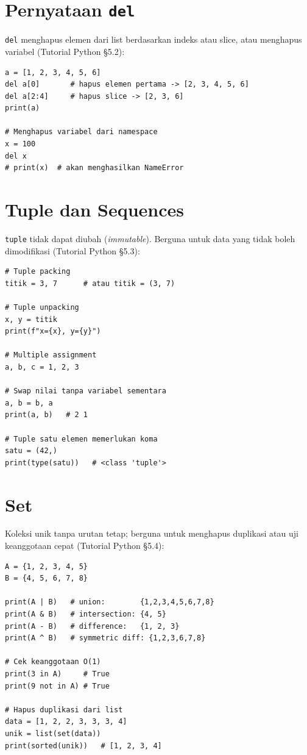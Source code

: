 \documentclass[../main.tex]{subfiles}
\begin{document}
\section{Pernyataan \texttt{del}}

\texttt{del} menghapus elemen dari list berdasarkan indeks atau slice, atau menghapus variabel (Tutorial Python §5.2):

\begin{lstlisting}[caption=Pernyataan del]
a = [1, 2, 3, 4, 5, 6]
del a[0]       # hapus elemen pertama -> [2, 3, 4, 5, 6]
del a[2:4]     # hapus slice -> [2, 3, 6]
print(a)

# Menghapus variabel dari namespace
x = 100
del x
# print(x)  # akan menghasilkan NameError
\end{lstlisting}

\section{Tuple dan Sequences}

\texttt{tuple} tidak dapat diubah (\textit{immutable}). Berguna untuk data yang tidak boleh dimodifikasi (Tutorial Python §5.3):

\begin{lstlisting}[caption=Tuple: packing dan unpacking]
# Tuple packing
titik = 3, 7      # atau titik = (3, 7)

# Tuple unpacking
x, y = titik
print(f"x={x}, y={y}")

# Multiple assignment
a, b, c = 1, 2, 3

# Swap nilai tanpa variabel sementara
a, b = b, a
print(a, b)   # 2 1

# Tuple satu elemen memerlukan koma
satu = (42,)
print(type(satu))   # <class 'tuple'>
\end{lstlisting}

\section{Set}

Koleksi unik tanpa urutan tetap; berguna untuk menghapus duplikasi atau uji keanggotaan cepat (Tutorial Python §5.4):

\begin{lstlisting}[caption=Operasi set]
A = {1, 2, 3, 4, 5}
B = {4, 5, 6, 7, 8}

print(A | B)   # union:        {1,2,3,4,5,6,7,8}
print(A & B)   # intersection: {4, 5}
print(A - B)   # difference:   {1, 2, 3}
print(A ^ B)   # symmetric diff: {1,2,3,6,7,8}

# Cek keanggotaan O(1)
print(3 in A)     # True
print(9 not in A) # True

# Hapus duplikasi dari list
data = [1, 2, 2, 3, 3, 3, 4]
unik = list(set(data))
print(sorted(unik))   # [1, 2, 3, 4]
\end{lstlisting}
\end{document}

